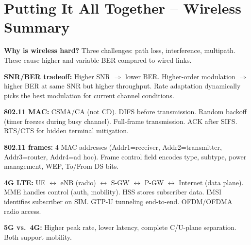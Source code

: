 \section{Putting It All Together -- Wireless Summary}

\begin{keybox}
\textbf{Why is wireless hard?} Three challenges: path loss, interference, multipath. These cause higher and variable BER compared to wired links.

\medskip
\textbf{SNR/BER tradeoff:} Higher SNR $\Rightarrow$ lower BER. Higher-order modulation $\Rightarrow$ higher BER at same SNR but higher throughput. Rate adaptation dynamically picks the best modulation for current channel conditions.

\medskip
\textbf{802.11 MAC:} CSMA/CA (not CD). DIFS before transmission. Random backoff (timer freezes during busy channel). Full-frame transmission. ACK after SIFS. RTS/CTS for hidden terminal mitigation.

\medskip
\textbf{802.11 frames:} 4 MAC addresses (Addr1=receiver, Addr2=transmitter, Addr3=router, Addr4=ad hoc). Frame control field encodes type, subtype, power management, WEP, To/From DS bits.

\medskip
\textbf{4G LTE:} UE $\leftrightarrow$ eNB (radio) $\leftrightarrow$ S-GW $\leftrightarrow$ P-GW $\leftrightarrow$ Internet (data plane). MME handles control (auth, mobility). HSS stores subscriber data. IMSI identifies subscriber on SIM. GTP-U tunneling end-to-end. OFDM/OFDMA radio access.

\medskip
\textbf{5G vs.\ 4G:} Higher peak rate, lower latency, complete C/U-plane separation. Both support mobility.
\end{keybox}

